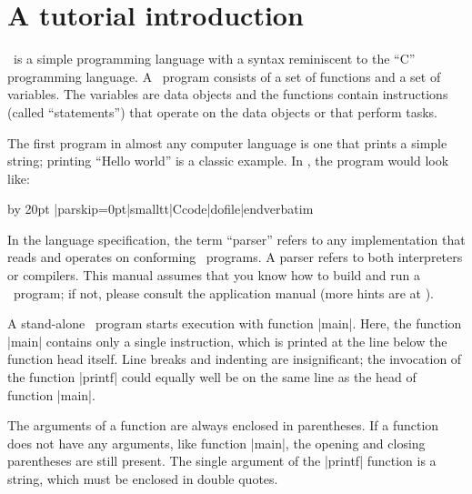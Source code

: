 \def\listingx{\par\begingroup \parskip=0pt \advance \leftskip by 20pt%
              \smallskip\nobreak \thinline\nobreak \smallskip\nobreak
}%
\def\endlistingx{\smallskip \thinline \endgroup
                 \vskip 2pt plus 5pt \goodbreak}%
\def\listfile#1{\listingx\def\dofile{\compactverbatim}}%

\chapter{A tutorial introduction}

\Small\ is a simple programming language with a syntax reminiscent to the ``C''
programming language. A \Small\ program consists of a set of functions and a
set of variables. The variables are data objects and the functions contain
instructions (called ``statements'') that operate on the data objects or that
perform tasks.

\noindent{}%
The first program in almost any computer language is one that prints a simple
string; printing ``Hello world'' is a classic example. In \Small, the program
would look like:

\bigskip\listfile{../examples/hello.sma}
\verbatim|parskip=0pt|smalltt|Ccode|dofile|endverbatim\endlistingx

In the language specification, the term ``parser'' refers to any
implementation that reads and operates on conforming \Small\ programs. A parser
refers to both interpreters or compilers. This manual assumes that you know
how to build and run a \Small\ program; if not, please consult the application
manual (more hints are at ).

A stand-alone \Small\ program starts execution with function |main|. Here, the
function |main| contains only a single instruction, which is printed at the line
below the function head itself. Line breaks and indenting are insignificant;
the invocation of the function |printf| could equally well be on the same line
as the head of function |main|.

The arguments of a function are always enclosed in parentheses. If a function
does not have any arguments, like function |main|, the opening and closing
parentheses are still present. The single argument of the |printf| function is
a string,
which must be enclosed in double quotes.

